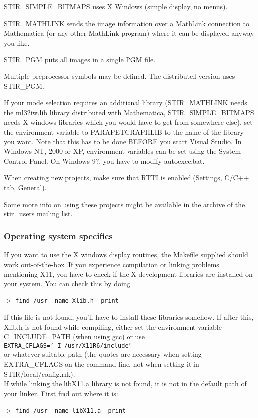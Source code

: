 \documentclass{article}
\newcommand{\cmdline}[1]{\par \noindent $>$ \texttt{#1}\par}
\begin{document}
STIR\_SIMPLE\_BITMAPS uses X Windows (simple display, no menus).


STIR\_MATHLINK sends the image information over a MathLink connection 
to Mathematica (or any other MathLink program) where it can be 
displayed anyway you like.


STIR\_PGM puts all images in a single PGM file.


Multiple preprocessor symbols may be defined. The distributed 
version uses STIR\_PGM.


If your mode selection requires an additional library (STIR\_MATHLINK 
needs the ml32iw.lib library distributed with Mathematica, STIR\_SIMPLE\_BITMAPS 
needs X windows libraries which you would have to get from somewhere 
else), set the environment variable to PARAPETGRAPHLIB to the 
name of the library you want. Note that this has to be done BEFORE 
you start Visual Studio. In Windows NT, 2000 or XP, environment 
variables can be set using the System Control Panel. On Windows 
9?, you have to modify autoexec.bat. 



When creating new projects, make sure that RTTI is enabled (Settings, 
C/C++ tab, General). 



Some more info on using these projects might be available in 
the archive of the stir\_users mailing list.


\subsubsection{
Operating system specifics}

{ 
}

If you want to use the X windows display routines, the Makefile 
supplied should work out-of-the-box. If you experience compilation 
or linking problems mentioning X11, you have to check if the 
X development libraries are installed on your system. You can 
check this by doing
\cmdline{find /usr -name Xlib.h -print}


If this file is not found, you'll have to install these libraries 
somehow. If after this, Xlib.h is not found while compiling, 
either set the environment variable C\_INCLUDE\_PATH (when using 
gcc) or use \\
\texttt{EXTRA\_CFLAGS='-I /usr/X11R6/include' }\\
or whatever suitable path (the quotes are necessary when setting 
EXTRA\_CFLAGS on the command line, not when setting it in 
STIR/local/config.mk).\\
If while linking the libX11.a library is not found, it is not 
in the default path of your linker. First find out where it is:
\cmdline{find /usr -name libX11.a --print}
\end{document}
